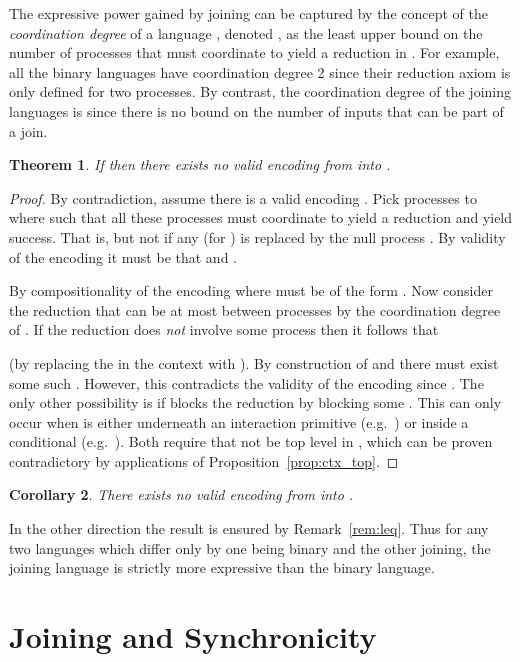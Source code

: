 \documentclass[submission,copyright,creativecommons]{eptcs}
\newtheorem{theorem}{Theorem}[section]
\newtheorem{corollary}[theorem]{Corollary}
\begin{document}
The expressive power gained by joining can be captured by the concept of the {\em coordination degree} of a language , denoted ,
as the least upper bound on the number of processes that must coordinate to yield a reduction in .
For example, all the binary languages  have coordination degree 2 since their
reduction axiom is only defined for two processes.
By contrast, the coordination degree of the joining languages is  since there is no bound on the
number of inputs that can be part of a join. 

\begin{theorem}\label{thm:int_deg_gt}
If  then there exists no valid encoding  from  into .
\end{theorem}
\begin{proof}
By contradiction, assume there is a valid encoding .
Pick  processes  to  where  such that all these processes
must coordinate to yield a reduction and yield success.
That is, 
but not if any  (for ) is replaced by the null process .
By validity of the encoding it must be that 
and .

By compositionality of the encoding 
 where
 must be of the form\linebreak
.
Now consider the reduction  that can be at most between 
processes by the coordination degree of .
If the reduction does {\em not} involve some process  then it follows that

(by replacing the  in the context  with ).
By construction of  and  there must
exist some such .
However, this contradicts the validity of the encoding since
.
The only other possibility is if  blocks the reduction by blocking some .
This can only occur when  is either underneath an interaction primitive
(e.g.~) or inside a conditional (e.g.~).
Both require that  not be top level in , which can be proven contradictory
by  applications of Proposition~\ref{prop:ctx_top}.
\end{proof}

\begin{corollary}
\label{cor:join_gt_bin}
There exists no valid encoding from  into .
\end{corollary}

In the other direction the result is ensured by Remark~\ref{rem:leq}.
Thus for any two languages which differ only by one being binary and the other joining, the
joining language is strictly more expressive than the binary language.

\section{Joining and Synchronicity}
\label{sec:join_synch}
\end{document}
